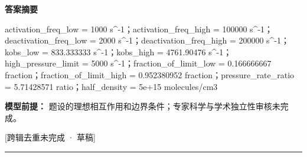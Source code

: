 \documentclass[UTF8,11pt,a4paper]{ctexart}
\begin{document}
\noindent\textbf{答案摘要}\par
activation\_freq\_low = 1000 s\textasciicircum{}-1；activation\_freq\_high = 100000 s\textasciicircum{}-1；deactivation\_freq\_low = 2000 s\textasciicircum{}-1；deactivation\_freq\_high = 200000 s\textasciicircum{}-1；kobs\_low = 833.333333 s\textasciicircum{}-1；kobs\_high = 4761.90476 s\textasciicircum{}-1；high\_pressure\_limit = 5000 s\textasciicircum{}-1；fraction\_of\_limit\_low = 0.166666667 fraction；fraction\_of\_limit\_high = 0.952380952 fraction；pressure\_rate\_ratio = 5.71428571 ratio；half\_density = 5e+15 molecules/cm3\par
\noindent\textbf{模型前提：}
题设的理想相互作用和边界条件；专家科学与学术独立性审核未完成。\par
\noindent\textcolor{red!65!black}{[跨辑去重未完成 · 草稿]} \par
\medskip\hrule\medskip
{}
\end{document}
